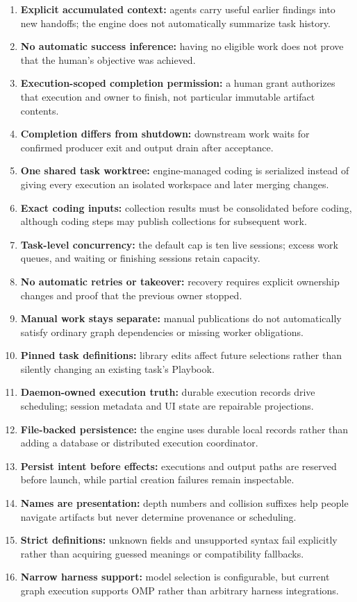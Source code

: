 \documentclass[letterpaper]{article}
\theoremstyle{definition}
\begin{document}
\begin{enumerate}
  \item \textbf{Explicit accumulated context:} agents carry useful earlier findings into new handoffs; the engine does not automatically summarize task history.
  \item \textbf{No automatic success inference:} having no eligible work does not prove that the human's objective was achieved.
  \item \textbf{Execution-scoped completion permission:} a human grant authorizes that execution and owner to finish, not particular immutable artifact contents.
  \item \textbf{Completion differs from shutdown:} downstream work waits for confirmed producer exit and output drain after acceptance.
  \item \textbf{One shared task worktree:} engine-managed coding is serialized instead of giving every execution an isolated workspace and later merging changes.
  \item \textbf{Exact coding inputs:} collection results must be consolidated before coding, although coding steps may publish collections for subsequent work.
  \item \textbf{Task-level concurrency:} the default cap is ten live sessions; excess work queues, and waiting or finishing sessions retain capacity.
  \item \textbf{No automatic retries or takeover:} recovery requires explicit ownership changes and proof that the previous owner stopped.
  \item \textbf{Manual work stays separate:} manual publications do not automatically satisfy ordinary graph dependencies or missing worker obligations.
  \item \textbf{Pinned task definitions:} library edits affect future selections rather than silently changing an existing task's Playbook.
  \item \textbf{Daemon-owned execution truth:} durable execution records drive scheduling; session metadata and UI state are repairable projections.
  \item \textbf{File-backed persistence:} the engine uses durable local records rather than adding a database or distributed execution coordinator.
  \item \textbf{Persist intent before effects:} executions and output paths are reserved before launch, while partial creation failures remain inspectable.
  \item \textbf{Names are presentation:} depth numbers and collision suffixes help people navigate artifacts but never determine provenance or scheduling.
  \item \textbf{Strict definitions:} unknown fields and unsupported syntax fail explicitly rather than acquiring guessed meanings or compatibility fallbacks.
  \item \textbf{Narrow harness support:} model selection is configurable, but current graph execution supports OMP rather than arbitrary harness integrations.
\end{enumerate}
\end{document}
